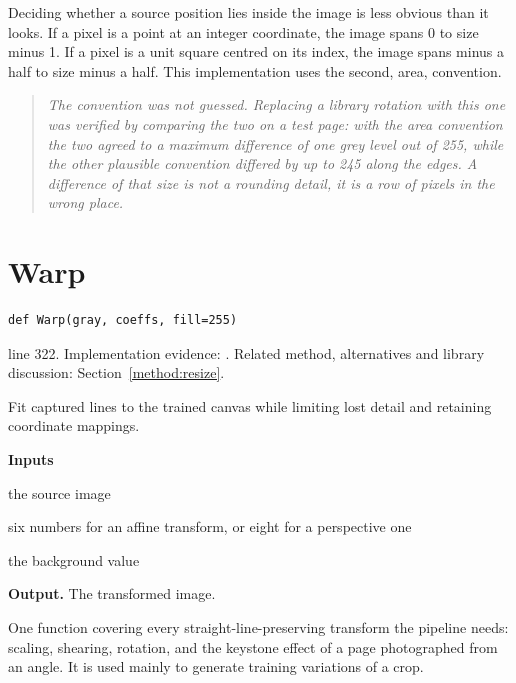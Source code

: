 Deciding whether a source position lies inside the image is less obvious than it looks. If a pixel is a point at an integer coordinate, the image spans 0 to size minus 1. If a pixel is a unit square centred on its index, the image spans minus a half to size minus a half. This implementation uses the second, area, convention.


\begin{quote}\small\itshape The convention was not guessed. Replacing a library rotation with this one was verified by comparing the two on a test page: with the area convention the two agreed to a maximum difference of one grey level out of 255, while the other plausible convention differed by up to 245 along the edges. A difference of that size is not a rounding detail, it is a row of pixels in the wrong place.\end{quote}


\section{Warp}\label{fn:segment:Warp}
\begin{lstlisting}[style=sig]
def Warp(gray, coeffs, fill=255)
\end{lstlisting}
 line 322. Implementation evidence: \cite{code2026}. Related method, alternatives and library discussion: Section~\ref{method:resize}.


Fit captured lines to the trained canvas while limiting lost detail and retaining coordinate mappings.




\noindent\textbf{Inputs}
\begin{description}[leftmargin=2.2em,style=nextline,font=\normalfont\ttfamily]\setlength\itemsep{1pt}
  \item[{img}] \normalfont the source image
  \item[{coeffs}] \normalfont six numbers for an affine transform, or eight for a perspective one
  \item[{fill}] \normalfont the background value
\end{description}

\noindent\textbf{Output.} The transformed image.


One function covering every straight-line-preserving transform the pipeline needs: scaling, shearing, rotation, and the keystone effect of a page photographed from an angle. It is used mainly to generate training variations of a crop.


